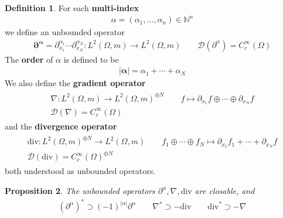 \documentclass[12pt,b5paper,notitlepage]{article}
\theoremstyle{definition}
\newtheorem{df}{Definition}[subsection]
\theoremstyle{plain}
\newtheorem{pp}[df]{Proposition}
\newcommand{\Dom}{\mathscr{D}}
\newcommand{\Nbb}{\mathbb N}
\newcommand{\dive}{\mathrm{div}}
\numberwithin{equation}{section}
\begin{document}
\begin{df}
For each \textbf{multi-index}
\begin{align*}
\alpha=(\alpha_1,\dots,\alpha_n)\in\Nbb^n
\end{align*}
we  define an unbounded operator 
\begin{align}
\pmb{\partial^\alpha}=\partial_{x_1}^{\alpha_1}\cdots\partial_{x_N}^{\alpha_N}:L^2(\Omega,m)\rightarrow L^2(\Omega,m)\qquad\Dom(\partial^\alpha)=C_c^\infty(\Omega)
\end{align}
The \textbf{order} of $\alpha$ is defined to be 
\begin{align*}
\pmb{|\alpha|}=\alpha_1+\cdots+\alpha_N
\end{align*}
We also define the \textbf{gradient operator} 
\begin{gather}
\begin{gathered}
\nabla:L^2(\Omega,m)\rightarrow L^2(\Omega,m)^{\oplus N}\qquad f\mapsto \partial_{x_1}f\oplus\cdots\oplus\partial_{x_N}f\\
\Dom(\nabla)=C_c^\infty(\Omega)
\end{gathered}
\end{gather}
and the \textbf{divergence operator}
\begin{gather}
\begin{gathered}
\dive:L^2(\Omega,m)^{\oplus N}\rightarrow L^2(\Omega,m)\qquad f_1\oplus\cdots\oplus f_N\mapsto \partial_{x_1}f_1+\cdots+\partial_{x_N}f\\
\Dom(\dive)=C_c^\infty(\Omega)^{\oplus N}
\end{gathered}
\end{gather}
both understood as unbounded operators.
\end{df}


\begin{pp}\label{lb406}
The unbounded operators $\partial^\alpha,\nabla,\dive$ are closable, and
\begin{align}\label{eq207}
(\partial^\alpha)^*\supset (-1)^{|\alpha|}\partial^\alpha\qquad \nabla^*\supset-\dive\qquad \dive^*\supset-\nabla
\end{align}
\end{pp}
\end{document}
